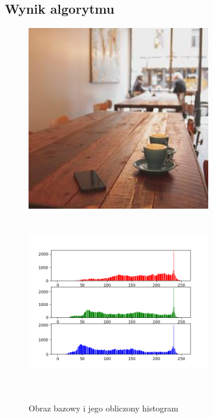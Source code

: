 \documentclass[a4paper,12pt]{book}
\begin{document}
\subsection*{Wynik algorytmu}
\begin{figure}[H]
	\caption{Obraz bazowy i jego obliczony histogram}
	\includegraphics[width=8cm, height=8cm]{coffee-unmodified.jpg}
	\includegraphics[width=8cm, height=8cm]{6-1/calculate-coffee.png}
\end{figure}
\end{document}
